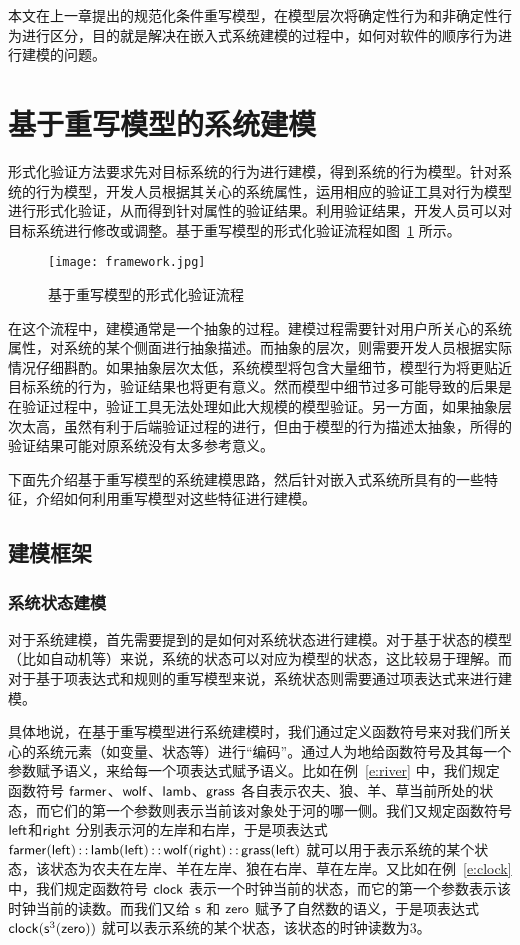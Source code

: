 本文在上一章提出的规范化条件重写模型，在模型层次将确定性行为和非确定性行为进行区分，目的就是解决在嵌入式系统建模的过程中，如何对软件的顺序行为进行建模的问题。

\section{基于重写模型的系统建模}
\label{s:modeling}

形式化验证方法要求先对目标系统的行为进行建模，得到系统的行为模型。针对系统的行为模型，开发人员根据其关心的系统属性，运用相应的验证工具对行为模型进行形式化验证，从而得到针对属性的验证结果。利用验证结果，开发人员可以对目标系统进行修改或调整。基于重写模型的形式化验证流程如图~\ref{f:framework} 所示。

\begin{figure}[ht]
\centering
\texttt{[image: framework.jpg]}
\caption{基于重写模型的形式化验证流程}
\label{f:framework}
\end{figure}

在这个流程中，建模通常是一个抽象的过程。建模过程需要针对用户所关心的系统属性，对系统的某个侧面进行抽象描述。而抽象的层次，则需要开发人员根据实际情况仔细斟酌。如果抽象层次太低，系统模型将包含大量细节，模型行为将更贴近目标系统的行为，验证结果也将更有意义。然而模型中细节过多可能导致的后果是在验证过程中，验证工具无法处理如此大规模的模型验证。另一方面，如果抽象层次太高，虽然有利于后端验证过程的进行，但由于模型的行为描述太抽象，所得的验证结果可能对原系统没有太多参考意义。

下面先介绍基于重写模型的系统建模思路，然后针对嵌入式系统所具有的一些特征，介绍如何利用重写模型对这些特征进行建模。

\subsection{建模框架}

\subsubsection{系统状态建模}
对于系统建模，首先需要提到的是如何对系统状态进行建模。对于基于状态的模型（比如自动机等）来说，系统的状态可以对应为模型的状态，这比较易于理解。而对于基于项表达式和规则的重写模型来说，系统状态则需要通过项表达式来进行建模。

具体地说，在基于重写模型进行系统建模时，我们通过定义函数符号来对我们所关心的系统元素（如变量、状态等）进行“编码”。通过人为地给函数符号及其每一个参数赋予语义，来给每一个项表达式赋予语义。比如在例~\ref{e:river} 中，我们规定函数符号 $\operatorname{\mathsf{farmer}}$、$\operatorname{\mathsf{wolf}}$、$\operatorname{\mathsf{lamb}}$、$\operatorname{\mathsf{grass}}$ 各自表示农夫、狼、羊、草当前所处的状态，而它们的第一个参数则表示当前该对象处于河的哪一侧。我们又规定函数符号 $\operatorname{\mathsf{left}}$和$\operatorname{\mathsf{right}}$ 分别表示河的左岸和右岸，于是项表达式 $\operatorname{\mathsf{farmer}}(\operatorname{\mathsf{left}}) \operatorname{\mathsf{::}} \operatorname{\mathsf{lamb}}(\operatorname{\mathsf{left}}) \operatorname{\mathsf{::}} \operatorname{\mathsf{wolf}}(\operatorname{\mathsf{right}}) \operatorname{\mathsf{::}} \operatorname{\mathsf{grass}}(\operatorname{\mathsf{left}})$ 就可以用于表示系统的某个状态，该状态为农夫在左岸、羊在左岸、狼在右岸、草在左岸。又比如在例~\ref{e:clock} 中，我们规定函数符号 $\operatorname{\mathsf{clock}}$ 表示一个时钟当前的状态，而它的第一个参数表示该时钟当前的读数。而我们又给 $\operatorname{\mathsf{s}}$ 和 $\operatorname{\mathsf{zero}}$ 赋予了自然数的语义，于是项表达式 $\operatorname{\mathsf{clock}}(\operatorname{\mathsf{s}}^3(\operatorname{\mathsf{zero}}))$ 就可以表示系统的某个状态，该状态的时钟读数为3。

